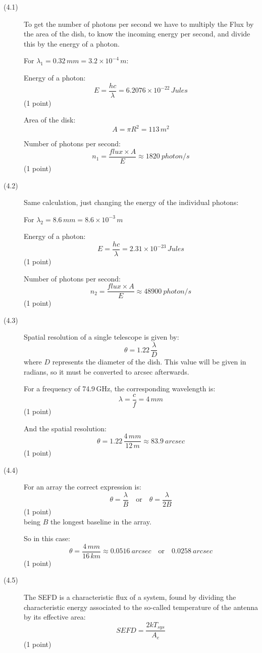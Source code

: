 \begin{description}
\item[(4.1)] To get the number of photons per second we have to multiply the
Flux by the area of the dish, to know the incoming energy per second, and
divide this by the energy of a photon.

For $\lambda_1 = 0.32\,mm = 3.2 \times 10^{-4}\,m$:

Energy of a photon:
\[ E = \frac{hc}{\lambda} = 6.2076 \times 10^{-22}\,Jules \]
\hfill(1 point)

Area of the disk:
\[ A = \pi R^2 = 113\,m^2 \]

Number of photons per second:
\[ n_1 = \frac{flux \times A}{E} \approx 1820~photon/s \]
\hfill(1 point)

\item[(4.2)] Same calculation, just changing the energy of the individual
photons:

For $\lambda_2 = 8.6\,mm = 8.6 \times 10^{-3}\,m$

Energy of a photon:
\[ E = \frac{hc}{\lambda} = 2.31 \times 10^{-23}\,Jules \]
\hfill(1 point)

Number of photons per second:
\[ n_2 = \frac{flux \times A}{E} \approx 48900~photon/s \]
\hfill(1 point)

\item[(4.3)] Spatial resolution of a single telescope is given by:
\[ \theta = 1.22\,\frac{\lambda}{D} \]
where $D$ represents the diameter of the dish. This value will be given in
radians, so it must be converted to arcsec afterwards.

For a frequency of 74.9\,GHz, the corresponding wavelength is:
\[ \lambda = \frac{c}{f} = 4\,mm \]
\hfill(1 point)

And the spatial resolution:
\[ \theta = 1.22\,\frac{4\,mm}{12\,m} \approx 83.9~arcsec \]
\hfill(1 point)

\item[(4.4)] For an array the correct expression is:
\[ \theta = \frac{\lambda}{B} \quad\text{or}\quad
   \theta = \frac{\lambda}{2B} \]
\hfill(1 point)\\
being $B$ the longest baseline in the array.

So in this case:
\[ \theta = \frac{4\,mm}{16\,km} \approx 0.0516~arcsec
   \quad\text{or}\quad 0.0258~arcsec \]
\hfill(1 point)

\item[(4.5)] The SEFD is a characteristic flux of a system, found by
dividing the characteristic energy associated to the so-called temperature of
the antenna by its effective area:
\[ SEFD = \frac{2kT_{sys}}{A_e} \]
\hfill(1 point)


\end{description}
